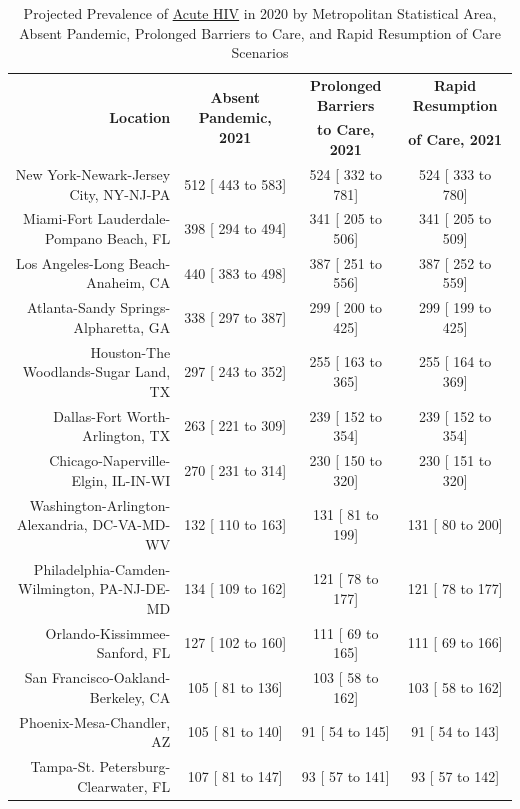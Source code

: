 \documentclass{article}
\begin{document}
\begin{table}[H]
	\caption{Projected Prevalence of \underline{Acute HIV} in 2020 by Metropolitan Statistical Area, Absent Pandemic, Prolonged Barriers to Care, and Rapid Resumption of Care Scenarios}
	\footnotesize
	\begin{tabular}{|r|c|c|c|}
		\hline
		\multirow{2}{*}{\textbf{Location}} & \multirow{2}{*}{\textbf{Absent Pandemic, 2021}} & \textbf{Prolonged Barriers} & \textbf{Rapid Resumption}\\
		&  & \textbf{to Care, 2021} & \textbf{of Care, 2021}\\
		\hline\hline
		New York-Newark-Jersey City, NY-NJ-PA &   512 [  443 to   583] &   524 [  332 to   781] &   524 [  333 to   780]\\
		Miami-Fort Lauderdale-Pompano Beach, FL &   398 [  294 to   494] &   341 [  205 to   506] &   341 [  205 to   509]\\
		Los Angeles-Long Beach-Anaheim, CA &   440 [  383 to   498] &   387 [  251 to   556] &   387 [  252 to   559]\\
		Atlanta-Sandy Springs-Alpharetta, GA &   338 [  297 to   387] &   299 [  200 to   425] &   299 [  199 to   425]\\
		Houston-The Woodlands-Sugar Land, TX &   297 [  243 to   352] &   255 [  163 to   365] &   255 [  164 to   369]\\
		Dallas-Fort Worth-Arlington, TX &   263 [  221 to   309] &   239 [  152 to   354] &   239 [  152 to   354]\\
		Chicago-Naperville-Elgin, IL-IN-WI &   270 [  231 to   314] &   230 [  150 to   320] &   230 [  151 to   320]\\
		Washington-Arlington-Alexandria, DC-VA-MD-WV &   132 [  110 to   163] &   131 [   81 to   199] &   131 [   80 to   200]\\
		Philadelphia-Camden-Wilmington, PA-NJ-DE-MD &   134 [  109 to   162] &   121 [   78 to   177] &   121 [   78 to   177]\\
		Orlando-Kissimmee-Sanford, FL &   127 [  102 to   160] &   111 [   69 to   165] &   111 [   69 to   166]\\
		San Francisco-Oakland-Berkeley, CA &   105 [   81 to   136] &   103 [   58 to   162] &   103 [   58 to   162]\\
		Phoenix-Mesa-Chandler, AZ &   105 [   81 to   140] &    91 [   54 to   145] &    91 [   54 to   143]\\
		Tampa-St. Petersburg-Clearwater, FL &   107 [   81 to   147] &    93 [   57 to   141] &    93 [   57 to   142]\\

\end{tabular}
\end{table}
\end{document}
